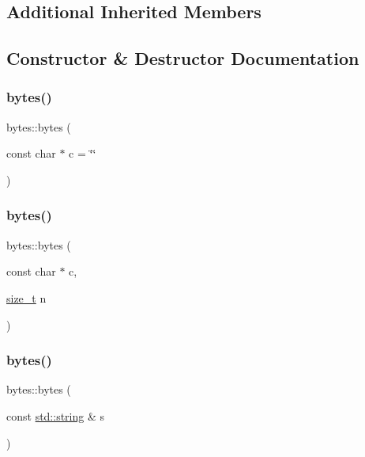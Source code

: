 \subsection*{Additional Inherited Members}


\subsection{Constructor \& Destructor Documentation}
\mbox{\label{classbytes_a61beb3470b0464c351a2d8e4cd892691}} 
\subsubsection{\texorpdfstring{bytes()}{bytes()}\hspace{0.1cm}{\footnotesize\ttfamily [1/3]}}
{\footnotesize\ttfamily bytes\+::bytes (\begin{DoxyParamCaption}\item[{const char $\ast$}]{c = {\ttfamily \char`\"{}\char`\"{}} }\end{DoxyParamCaption})\hspace{0.3cm}{\ttfamily [inline]}}

\mbox{\label{classbytes_a8205f27ee2cd267771e4bc304baf44db}} 
\subsubsection{\texorpdfstring{bytes()}{bytes()}\hspace{0.1cm}{\footnotesize\ttfamily [2/3]}}
{\footnotesize\ttfamily bytes\+::bytes (\begin{DoxyParamCaption}\item[{const char $\ast$}]{c,  }\item[{\mbox{\hyperlink{detail_2common_8h_a801d6a451a01953ef8cbae6feb6a3638}{size\+\_\+t}}}]{n }\end{DoxyParamCaption})\hspace{0.3cm}{\ttfamily [inline]}}

\mbox{\label{classbytes_a39cb6d38b9530c023063852b013ecf50}} 
\subsubsection{\texorpdfstring{bytes()}{bytes()}\hspace{0.1cm}{\footnotesize\ttfamily [3/3]}}
{\footnotesize\ttfamily bytes\+::bytes (\begin{DoxyParamCaption}\item[{const \mbox{\hyperlink{_s_d_l__opengl__glext_8h_ab4ccfaa8ab0e1afaae94dc96ef52dde1}{std\+::string}} \&}]{s }\end{DoxyParamCaption})\hspace{0.3cm}{\ttfamily [inline]}}



